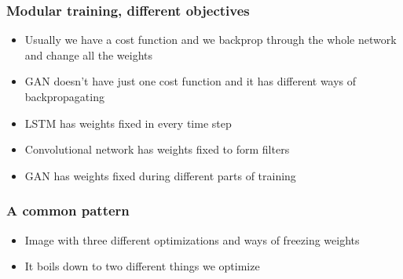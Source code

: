 \documentclass{beamer}
\begin{document}
\begin{frame}
	\frametitle{Modular training, different objectives}
	\begin{itemize}
		\item Usually we have a cost function and we backprop through the whole network and change all the weights
		\item GAN doesn't have just one cost function and it has different ways of backpropagating
		\item LSTM has weights fixed in every time step
		\item Convolutional network has weights fixed to form filters
		\item GAN has weights fixed during different parts of training
	\end{itemize}
\end{frame}


\begin{frame}
	\frametitle{A common pattern}
	\begin{itemize}
		\item Image with three different optimizations and ways of freezing weights
		\item It boils down to two different things we optimize
	\end{itemize}
\end{frame}
\end{document}
